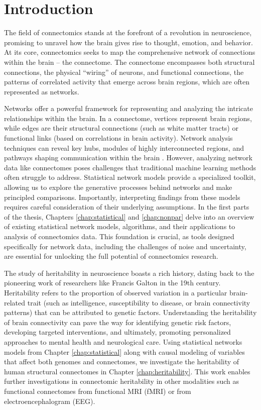 \chapter{Introduction} \label{chap-intro}

The field of connectomics stands at the forefront of a revolution in neuroscience, promising to unravel how the brain gives rise to thought, emotion, and behavior. At its core, connectomics seeks to map the comprehensive network of connections within the brain – the connectome. The connectome encompasses both structural connections, the physical ``wiring'' of neurons, and functional connections, the patterns of correlated activity that emerge across brain regions, which are often represented as networks.

Networks offer a powerful framework for representing and analyzing the intricate relationships within the brain. In a connectome, vertices represent brain regions, while edges are their structural connections (such as white matter tracts) or functional links (based on correlations in brain activity). Network analysis techniques can reveal key hubs, modules of highly interconnected regions, and pathways shaping communication within the brain \cite{sporns2005human, behrens2012human, van2016comparative, fornito2015connectomics, griffa2013structural}. However, analyzing network data like connectomes poses challenges that traditional machine learning methods often struggle to address. Statistical network models provide a specialized toolkit, allowing us to explore the generative processes behind networks and make principled comparisons. Importantly, interpreting findings from these models requires careful consideration of their underlying assumptions. In the first parts of the thesis, Chapters \ref{chap:statistical} and \ref{chap:nonpar} delve into an overview of existing statistical network models, algorithms, and their applications to analysis of connectomics data. This foundation is crucial, as tools designed specifically for network data, including the challenges of noise and uncertainty, are essential for unlocking the full potential of connectomics research.

The study of heritability in neuroscience boasts a rich history, dating back to the pioneering work of researchers like Francis Galton in the 19th century. Heritability refers to the proportion of observed variation in a particular brain-related trait (such as intelligence, susceptibility to disease, or brain connectivity patterns) that can be attributed to genetic factors. Understanding the heritability of brain connectivity can pave the way for identifying genetic risk factors, developing targeted interventions, and ultimately, promoting personalized approaches to mental health and neurological care. Using statistical networks models from Chapter \ref{chap:statistical} along with causal modeling of variables that affect both genomes and connectomes, we investigate the heritability of human structural connectomes in Chapter \ref{chap:heritability}. This work enables further investigations in connectomic heritability in other modalities such as functional connectomes from functional MRI (fMRI) or from electroencephalogram (EEG). 

